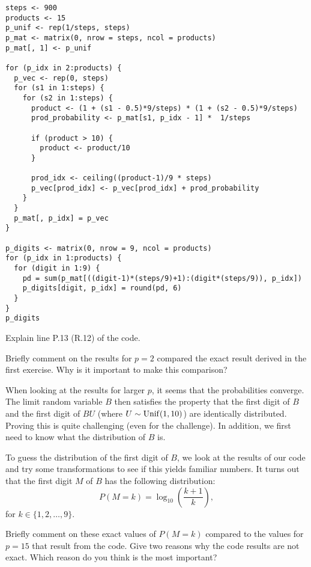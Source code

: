 \begin{verbatim}
steps <- 900
products <- 15
p_unif <- rep(1/steps, steps)
p_mat <- matrix(0, nrow = steps, ncol = products)
p_mat[, 1] <- p_unif

for (p_idx in 2:products) {
  p_vec <- rep(0, steps)
  for (s1 in 1:steps) {
    for (s2 in 1:steps) {
      product <- (1 + (s1 - 0.5)*9/steps) * (1 + (s2 - 0.5)*9/steps)
      prod_probability <- p_mat[s1, p_idx - 1] *  1/steps

      if (product > 10) {
        product <- product/10
      }

      prod_idx <- ceiling((product-1)/9 * steps)
      p_vec[prod_idx] <- p_vec[prod_idx] + prod_probability
    }
  }
  p_mat[, p_idx] = p_vec
}

p_digits <- matrix(0, nrow = 9, ncol = products)
for (p_idx in 1:products) {
  for (digit in 1:9) {
    pd = sum(p_mat[((digit-1)*(steps/9)+1):(digit*(steps/9)), p_idx])
    p_digits[digit, p_idx] = round(pd, 6)
  }
}
p_digits
\end{verbatim}

\vspace{5pt}

\begin{exercise}
Explain line P.13 (R.12) of the code.
\end{exercise}

\begin{exercise}
Briefly comment on the results for $p=2$ compared the exact result derived in the first exercise. Why is it important to make this comparison?
\end{exercise}

When looking at the results for larger $p$, it seems that the probabilities converge. The limit random variable $B$ then satisfies the property that the first digit of $B$ and the first digit of $BU$ (where $U \sim \mathrm{Unif}(1,10)$) are identically distributed.  Proving this is quite challenging (even for the challenge). In addition, we first need to know what the distribution of $B$ is.

To guess the  distribution of the first digit of $B$, we look at the results of our code and try some transformations to see if this yields familiar numbers. It turns out that the first digit $M$ of $B$ has the following distribution:
\begin{equation*}
P(M=k) = \log_{10}\left(\frac{k+1}{k}\right),
\end{equation*}
for $k \in \{1,2,\ldots, 9\}$.

\begin{exercise}
Briefly comment on these exact values of $P(M=k)$ compared to the values for $p=15$ that result from the code. Give two reasons why the code results are not exact. Which reason do you think is the most important?
\end{exercise}

